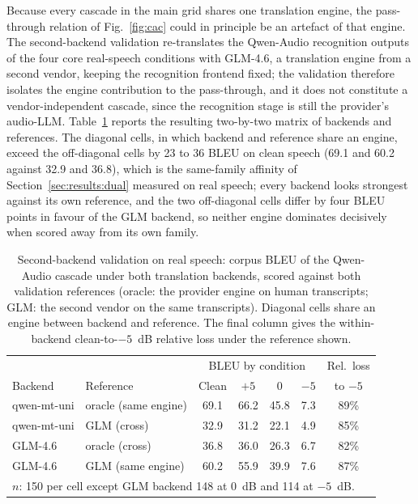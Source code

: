 Because every cascade in the main grid shares one translation engine, the
pass-through relation of Fig.~\ref{fig:cac} could in principle be an
artefact of that engine. The second-backend validation re-translates the
Qwen-Audio recognition outputs of the four core real-speech conditions
with GLM-4.6, a translation engine from a second vendor, keeping the
recognition frontend fixed; the validation therefore isolates the engine
contribution to the pass-through, and it does not constitute a
vendor-independent cascade, since the recognition stage is still the
provider's audio-LLM. Table~\ref{tab:backend} reports the resulting
two-by-two matrix of backends and references. The diagonal cells, in which
backend and reference share an engine, exceed the off-diagonal cells by 23
to 36 BLEU on clean speech (69.1 and 60.2 against 32.9 and 36.8), which is
the same-family affinity of Section~\ref{sec:results:dual} measured on
real speech; every backend looks strongest against its own reference, and
the two off-diagonal cells differ by four BLEU points in favour of the
GLM backend, so neither engine dominates decisively when scored away from
its own family.

\begin{table}[t]
\centering
\caption{Second-backend validation on real speech: corpus BLEU of the
Qwen-Audio cascade under both translation backends, scored against both
validation references (oracle: the provider engine on human transcripts;
GLM: the second vendor on the same transcripts). Diagonal cells share an
engine between backend and reference. The final column gives the
within-backend clean-to-$-5$~dB relative loss under the reference shown.}
\label{tab:backend}
\small
\setlength{\tabcolsep}{2.6pt}
\begin{tabular}{llccccc}
\toprule
 & & \multicolumn{4}{c}{BLEU by condition} & Rel.\ loss \\
Backend & Reference & Clean & $+5$ & 0 & $-5$ & to $-5$ \\
\midrule
qwen-mt-uni & oracle (same engine) & 69.1 & 66.2 & 45.8 & 7.3 & 89\% \\
qwen-mt-uni & GLM (cross) & 32.9 & 31.2 & 22.1 & 4.9 & 85\% \\
GLM-4.6 & oracle (cross) & 36.8 & 36.0 & 26.3 & 6.7 & 82\% \\
GLM-4.6 & GLM (same engine) & 60.2 & 55.9 & 39.9 & 7.6 & 87\% \\
\bottomrule
\multicolumn{7}{l}{\footnotesize $n$: 150 per cell except GLM backend 148 at 0~dB and 114 at $-5$~dB.} \\
\end{tabular}
\end{table}

